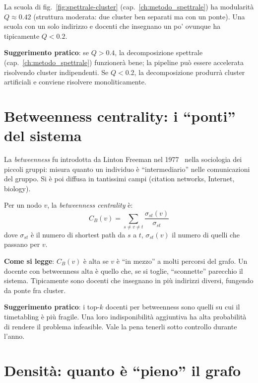 \begin{esempiobox}
La scuola di fig.~\ref{fig:spettrale-cluster}
(cap.~\ref{ch:metodo_spettrale}) ha modularit\`a $Q \approx
0.42$ (struttura moderata: due cluster ben separati ma con
un ponte). Una scuola con un solo indirizzo e docenti che
insegnano un po' ovunque ha tipicamente $Q < 0.2$.
\end{esempiobox}

\textbf{Suggerimento pratico}: se $Q > 0.4$, la
decomposizione spettrale (cap.~\ref{ch:metodo_spettrale})
funzioner\`a bene; la pipeline pu\`o essere accelerata
risolvendo cluster indipendenti. Se $Q < 0.2$, la
decomposizione produrr\`a cluster artificiali e conviene
risolvere monoliticamente.

\section{Betweenness centrality: i ``ponti'' del sistema}

\begin{storiabox}
La \emph{betweenness} fu introdotta da Linton Freeman nel
1977~\parencite{freeman1977} nella sociologia dei piccoli
gruppi: misura quanto un individuo \`e ``intermediario'' nelle
comunicazioni del gruppo. Si \`e poi diffusa in tantissimi
campi (citation networks, Internet, biology).
\end{storiabox}

\begin{defbox}
Per un nodo $v$, la \emph{betweenness centrality} \`e:
\[
  C_B(v) = \sum_{s \neq v \neq t} \frac{\sigma_{st}(v)}{\sigma_{st}}
\]
dove $\sigma_{st}$ \`e il numero di shortest path da $s$ a
$t$, $\sigma_{st}(v)$ il numero di quelli che passano per
$v$.
\end{defbox}

\textbf{Come si legge}: $C_B(v)$ \`e alta se $v$ \`e ``in
mezzo'' a molti percorsi del grafo. Un docente con
betweenness alta \`e quello che, se si toglie, ``sconnette''
parecchio il sistema. Tipicamente sono docenti che
insegnano in pi\`u indirizzi diversi, fungendo da ponte fra
cluster.

\textbf{Suggerimento pratico}: i top-$k$ docenti per
betweenness sono quelli su cui il timetabling \`e pi\`u
fragile. Una loro indisponibilit\`a aggiuntiva ha alta
probabilit\`a di rendere il problema infeasible. Vale la
pena tenerli sotto controllo durante l'anno.

\section{Densit\`a: quanto \`e ``pieno'' il grafo}

